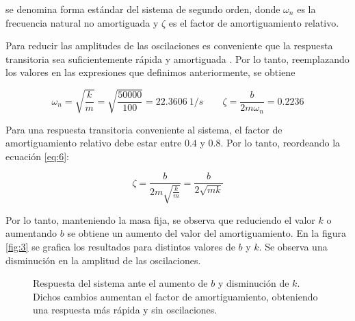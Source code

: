 \documentclass[twoside]{article}
\begin{document}
\noindent se denomina forma estándar del sistema de segundo orden, donde $\omega_n$ es la frecuencia natural no amortiguada y $\zeta$ es el factor de amortiguamiento relativo.

Para reducir las amplitudes de las oscilaciones es conveniente que la respuesta transitoria sea suficientemente rápida y amortiguada \cite{ogata}. Por lo tanto, reemplazando los valores en las expresiones que definimos anteriormente, se obtiene

\begin{equation}
    \label{eq:6}
    \omega_n = \sqrt{\frac{k}{m}} = \sqrt{\frac{50000}{100}} = \SI{22.3606}{1/s} \qquad \zeta = \frac{b}{2m\omega_n} = 0.2236
\end{equation}


Para una respuesta transitoria conveniente al sistema, el factor de amortiguamiento relativo debe estar entre $0.4$ y $0.8$. Por lo tanto, reordeando la ecuación \eqref{eq:6}:

\begin{equation}
    \zeta = \frac{b}{2m\sqrt{\displaystyle\frac{k}{m}}} = \frac{b}{2\sqrt{mk}}
\end{equation}


\noindent Por lo tanto, manteniendo la masa fija, se observa que reduciendo el valor $k$ o aumentando $b$ se obtiene un aumento del valor del amortiguamiento. En la figura \ref{fig:3} se grafica los resultados para distintos valores de $b$ y $k$. Se observa una disminución en la amplitud de las oscilaciones.


\begin{figure}[ht!]
    \centering
    \caption{Respuesta del sistema ante el aumento de $b$ y disminución de $k$. Dichos cambios aumentan el factor de amortiguamiento, obteniendo una respuesta más rápida y sin oscilaciones.}
    \label{fig:2}
\end{figure}
\end{document}
